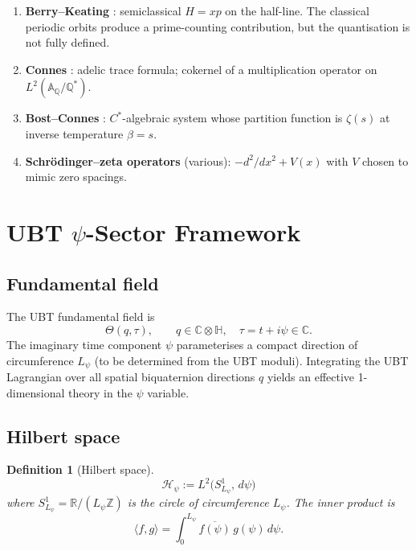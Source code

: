 \documentclass[11pt,a4paper]{article}
\newtheorem{definition}{Definition}
\begin{document}
\begin{enumerate}
\item \textbf{Berry--Keating} \cite{BK99}: semiclassical $H = xp$ on the
      half-line.  The classical periodic orbits produce a prime-counting
      contribution, but the quantisation is not fully defined.
\item \textbf{Connes} \cite{C99}: adelic trace formula; cokernel of a
      multiplication operator on $L^2(\mathbb{A}_\mathbb{Q}/\mathbb{Q}^*)$.
\item \textbf{Bost--Connes} \cite{BC95}: $C^*$-algebraic system whose
      partition function is $\zeta(s)$ at inverse temperature $\beta = s$.
\item \textbf{Schr\"odinger--zeta operators} (various): $-d^2/dx^2 + V(x)$
      with $V$ chosen to mimic zero spacings.
\end{enumerate}

\section{UBT \texorpdfstring{$\psi$}{psi}-Sector Framework}

\subsection{Fundamental field}

The UBT fundamental field is
\[
  \Theta(q,\tau), \qquad q \in \mathbb{C}\otimes\mathbb{H}, \quad
  \tau = t + i\psi \in \mathbb{C}.
\]
The imaginary time component $\psi$ parameterises a compact direction of
circumference $L_\psi$ (to be determined from the UBT moduli).  Integrating the
UBT Lagrangian over all spatial biquaternion directions $q$ yields an effective
1-dimensional theory in the $\psi$ variable.

\subsection{Hilbert space}
\label{sec:hilbert}

\begin{definition}[Hilbert space]
  \label{def:hilbert}
  \[
    \mathscr{H}_\psi := L^2\bigl(S^1_{L_\psi},\, d\psi\bigr)
  \]
  where $S^1_{L_\psi} = \mathbb{R}/(L_\psi\mathbb{Z})$ is the circle of
  circumference $L_\psi$.  The inner product is
  \[
    \langle f, g \rangle
    = \int_0^{L_\psi} \overline{f(\psi)}\, g(\psi)\, d\psi.
  \]
\end{definition}
\end{document}
